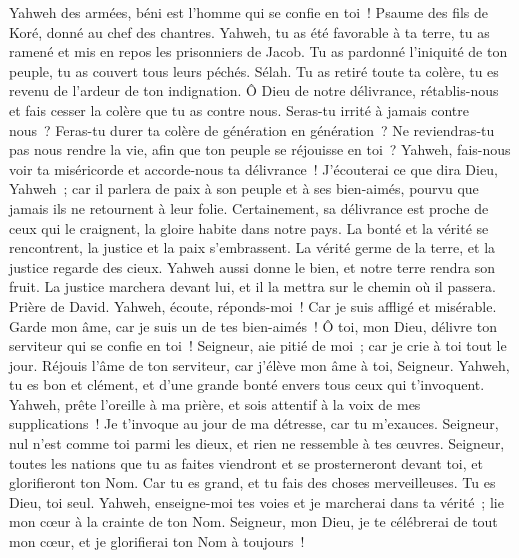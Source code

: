 \begin{multicols}{2}
Yahweh des armées, béni est l'homme qui se confie en toi~!
\VerseOne{}Psaume des fils de Koré, donné au chef des chantres.
Yahweh, tu as été favorable à ta terre, tu as ramené et mis en repos les prisonniers de Jacob.
Tu as pardonné l'iniquité de ton peuple, tu as couvert tous leurs péchés. Sélah.
Tu as retiré toute ta colère, tu es revenu de l'ardeur de ton indignation.
Ô Dieu de notre délivrance, rétablis-nous et fais cesser la colère que tu as contre nous.
Seras-tu irrité à jamais contre nous~? Feras-tu durer ta colère de génération en génération~?
Ne reviendras-tu pas nous rendre la vie, afin que ton peuple se réjouisse en toi~?
Yahweh, fais-nous voir ta miséricorde et accorde-nous ta délivrance~!
J'écouterai ce que dira Dieu, Yahweh~; car il parlera de paix à son peuple et à ses bien-aimés, pourvu que jamais ils ne retournent à leur folie.
Certainement, sa délivrance est proche de ceux qui le craignent, la gloire habite dans notre pays.
La bonté et la vérité se rencontrent, la justice et la paix s'embrassent.
La vérité germe de la terre, et la justice regarde des cieux.
Yahweh aussi donne le bien, et notre terre rendra son fruit.
La justice marchera devant lui, et il la mettra sur le chemin où il passera.
\VerseOne{}Prière de David. Yahweh, écoute, réponds-moi~! Car je suis affligé et misérable.
Garde mon âme, car je suis un de tes bien-aimés~! Ô toi, mon Dieu, délivre ton serviteur qui se confie en toi~!
Seigneur, aie pitié de moi~; car je crie à toi tout le jour.
Réjouis l'âme de ton serviteur, car j'élève mon âme à toi, Seigneur.
Yahweh, tu es bon et clément, et d'une grande bonté envers tous ceux qui t'invoquent.
Yahweh, prête l'oreille à ma prière, et sois attentif à la voix de mes supplications~!
Je t'invoque au jour de ma détresse, car tu m'exauces.
Seigneur, nul n'est comme toi parmi les dieux, et rien ne ressemble à tes œuvres.
Seigneur, toutes les nations que tu as faites viendront et se prosterneront devant toi, et glorifieront ton Nom.
Car tu es grand, et tu fais des choses merveilleuses. Tu es Dieu, toi seul.
Yahweh, enseigne-moi tes voies et je marcherai dans ta vérité~; lie mon cœur à la crainte de ton Nom.
Seigneur, mon Dieu, je te célébrerai de tout mon cœur, et je glorifierai ton Nom à toujours~!

\end{multicols}
